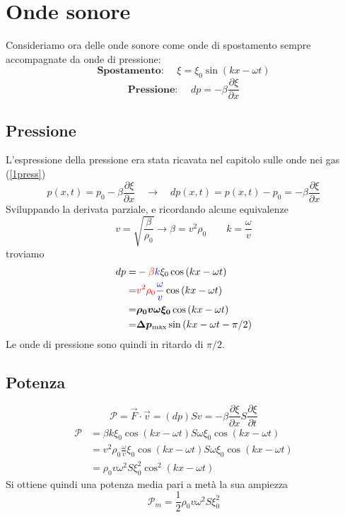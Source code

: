 \documentclass[x11names]{report}
\begin{document}
	\section{Onde sonore}\label{Onde Sonore}
	Consideriamo ora delle onde sonore come onde di spostamento sempre accompagnate da onde di pressione:
	\[ 
	\textbf{Spostamento: }\quad \xi = \xi _0\sin(kx-\omega t)
	\]
	\[ 
	\textbf{Pressione: }\quad dp = -\beta \frac{\partial\xi}{\partial x}
	\]
	\subsection{Pressione}
	L'espressione della pressione era stata ricavata nel capitolo sulle onde nei gas (\ref{1press})
	\[ 
	p(x,t) = p_0 -\beta \frac{\partial \xi }{\partial x} \quad \to \quad dp(x,t) = p(x,t) - p_0 = -\beta \frac{\partial \xi }{\partial x}
	\]
	Sviluppando la derivata parziale, e ricordando alcune equivalenze
	\[ 
	\boxed{v = \sqrt{\frac{\beta}{\rho_0}} \to  \beta = v^2\rho_0} \qquad \boxed{k = \frac{\omega }{v}}
	\]
	troviamo
	\begin{align*}
		dp =& -\textcolor{red}{\beta} \textcolor{blue}{k} \xi_0 \cos\left(kx-\omega t\right) \\
		   =& \textcolor{red}{v^2 \rho_0}\textcolor{blue}{\frac{\omega }{v}} \cos\left(kx-\omega t\right) \\
		   =& \boldsymbol{\rho_0 v \omega  \xi_0}  \cos\left(kx-\omega t\right) \\ 
		   =& \boldsymbol{\Delta p_{\text{max}}} \sin\left(kx -\omega t - \pi /2\right) \\
	\end{align*}
	Le onde di pressione sono quindi in ritardo di \(\pi /2\).
	
	\subsection{Potenza}
	\[ 
	\mathcal{P} = \overrightarrow{F}\cdot \vec{v} = (dp)S v = -\beta \frac{\partial\xi}{\partial x} S \frac{\partial\xi}{\partial t}
	\]
	\begin{align*}
		\mathcal{P} &= \beta k \xi_0 \cos\left(kx- \omega t\right) S \omega  \xi_0 \cos\left(kx- \omega t\right)\\
					&= v^2\rho_0 \frac{\omega}{v} \xi_0 \cos\left(kx- \omega t\right) S \omega \xi_0 \cos\left(kx- \omega t\right)\\
					&=  \rho_0 v \omega ^2 S \xi_0^2 \cos^2\left(kx- \omega t\right) 
	\end{align*}
	Si ottiene quindi una potenza media pari a metà la sua ampiezza
	\[ 
	\mathcal{P}_m = \frac{1}{2} \rho_0 v \omega ^2 S \xi_0^2
	\]
\end{document}

